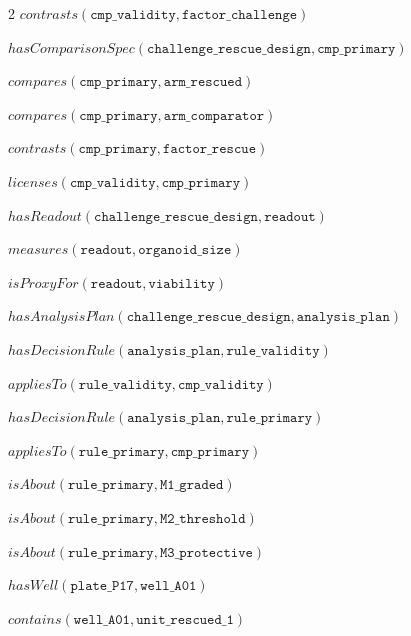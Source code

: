 \documentclass[10pt,a4paper]{article}
\begin{document}
{\begin{multicols}{2}
$\mathit{contrasts}(\mathtt{cmp\_\allowbreak{}validity}, \mathtt{factor\_\allowbreak{}challenge})$\par
$\mathit{hasComparisonSpec}(\mathtt{challenge\_\allowbreak{}rescue\_\allowbreak{}design}, \mathtt{cmp\_\allowbreak{}primary})$\par
$\mathit{compares}(\mathtt{cmp\_\allowbreak{}primary}, \mathtt{arm\_\allowbreak{}rescued})$\par
$\mathit{compares}(\mathtt{cmp\_\allowbreak{}primary}, \mathtt{arm\_\allowbreak{}comparator})$\par
$\mathit{contrasts}(\mathtt{cmp\_\allowbreak{}primary}, \mathtt{factor\_\allowbreak{}rescue})$\par
$\mathit{licenses}(\mathtt{cmp\_\allowbreak{}validity}, \mathtt{cmp\_\allowbreak{}primary})$\par
$\mathit{hasReadout}(\mathtt{challenge\_\allowbreak{}rescue\_\allowbreak{}design}, \mathtt{readout})$\par
$\mathit{measures}(\mathtt{readout}, \mathtt{organoid\_\allowbreak{}size})$\par
$\mathit{isProxyFor}(\mathtt{readout}, \mathtt{viability})$\par
$\mathit{hasAnalysisPlan}(\mathtt{challenge\_\allowbreak{}rescue\_\allowbreak{}design}, \mathtt{analysis\_\allowbreak{}plan})$\par
$\mathit{hasDecisionRule}(\mathtt{analysis\_\allowbreak{}plan}, \mathtt{rule\_\allowbreak{}validity})$\par
$\mathit{appliesTo}(\mathtt{rule\_\allowbreak{}validity}, \mathtt{cmp\_\allowbreak{}validity})$\par
$\mathit{hasDecisionRule}(\mathtt{analysis\_\allowbreak{}plan}, \mathtt{rule\_\allowbreak{}primary})$\par
$\mathit{appliesTo}(\mathtt{rule\_\allowbreak{}primary}, \mathtt{cmp\_\allowbreak{}primary})$\par
$\mathit{isAbout}(\mathtt{rule\_\allowbreak{}primary}, \mathtt{M1\_\allowbreak{}graded})$\par
$\mathit{isAbout}(\mathtt{rule\_\allowbreak{}primary}, \mathtt{M2\_\allowbreak{}threshold})$\par
$\mathit{isAbout}(\mathtt{rule\_\allowbreak{}primary}, \mathtt{M3\_\allowbreak{}protective})$\par
$\mathit{hasWell}(\mathtt{plate\_\allowbreak{}P17}, \mathtt{well\_\allowbreak{}A01})$\par
$\mathit{contains}(\mathtt{well\_\allowbreak{}A01}, \mathtt{unit\_\allowbreak{}rescued\_\allowbreak{}1})$\par

\end{multicols}}
\end{document}
